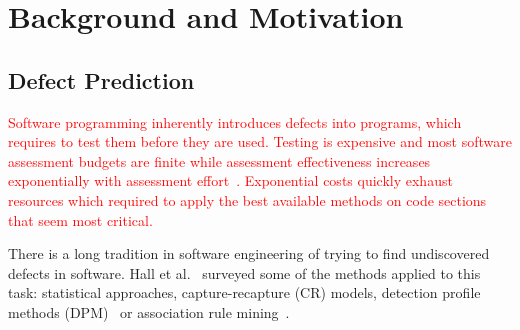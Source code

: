 \documentclass[sigconf,review, anonymous]{acmart}
\theoremstyle{break}
\theoremstyle{break}
\begin{document}

 



 


\section{Background and Motivation}

\subsection{Defect Prediction}
\label{sect:review}

\textcolor{red}{Software programming inherently introduces defects into programs, which requires to test them before they are used. Testing
is expensive and most software assessment budgets are finite while assessment effectiveness increases exponentially with assessment effort~\cite{fu2016tuning}. Exponential costs quickly exhaust resources which required to apply the best available methods on code sections
that seem most critical.}

There is a long tradition in software engineering of trying to find undiscovered defects in software. 
Hall et al.~\cite{hall2012systematic} surveyed some of the methods
applied to this task: statistical approaches, capture-recapture 
(CR) models, detection profile methods (DPM)~\cite{song2011general} or
association rule mining~\cite{song2006software}. 
\end{document}
